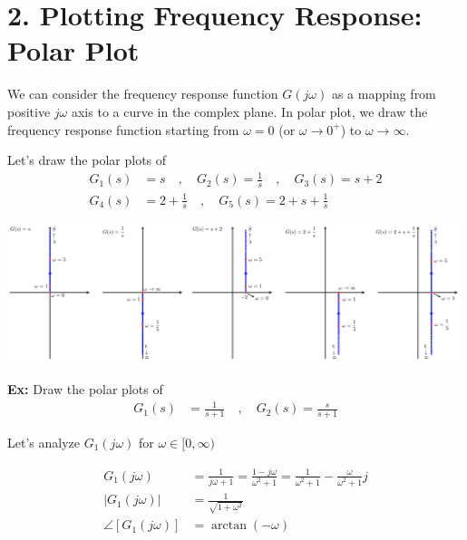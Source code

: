 \documentclass{article}
\begin{document}
\newpage

\section*{2. Plotting Frequency Response: Polar Plot}

We can consider the frequency response function $G(j \omega)$
as a mapping from positive $j \omega$ axis to a curve in 
the complex plane. In polar plot, we draw the frequency response
function starting from $\omega = 0$ (or $\omega \to 0^+$) to $\omega
\to \infty$.

Let's draw the polar plots of 
%
\begin{align*}
 G_1(s) &= s
 \quad , \quad
 G_2(s) = \frac{1}{s}
 \quad , \quad
 G_3(s) = s + 2
\\
 G_4(s) &= 2 + \frac{1}{s}
\quad , \quad
 G_5(s) = 2 + s +  \frac{1}{s}
\end{align*}

\vspace{6 pt}

  \begin{minipage}[h]{1\linewidth}
    \begin{center}
      \includegraphics[width=0.99\textwidth]{polar}
    \end{center}
  \end{minipage}

\vspace{6 pt}

\textbf{Ex:} Draw the polar plots of 
%
\begin{align*}
 G_1(s) &= \frac{1}{s+1}
 \quad , \quad
 G_2(s) = \frac{s}{s+1}
\end{align*}

Let's analyze $G_1(j \omega)$ for $\omega \in [0 , \infty)$

\begin{align*}
 G_1(j \omega) &= \frac{1}{j \omega +1} = \frac{1 - j \omega}{\omega^2 +1} 
= \frac{1}{\omega^2 +1} - \frac{\omega}{\omega^2 +1} j
\\
| G_1(j \omega) | &= \frac{1}{ \sqrt{1 + \omega^2} }
\\
\angle [ G_1(j \omega) ] &= \arctan (-\omega) 
\end{align*}
\end{document}
